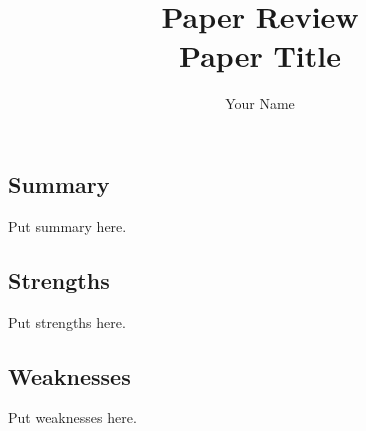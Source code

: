 \documentclass[letterpaper,twocolumn,10pt]{article}
\title{Paper Review\\
Paper Title}
\author{Your Name}
\begin{document}
\maketitle

\subsection*{Summary}

Put summary here.

\subsection*{Strengths}

Put strengths here.

\subsection*{Weaknesses}

Put weaknesses here.
\end{document}
